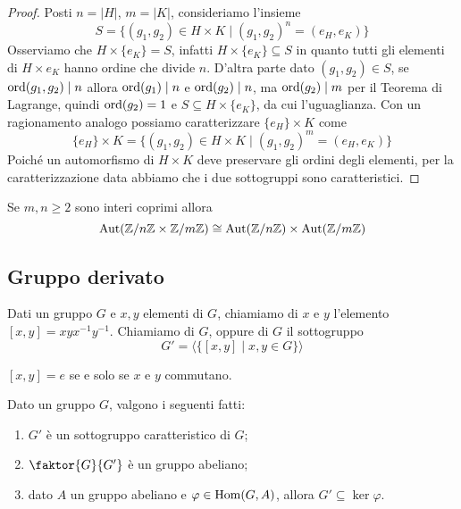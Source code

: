 \documentclass[11pt]{scrartcl}
\begin{document}
\begin{proof}
    Posti $n = |H|$, $m = |K|$, consideriamo l'insieme
    \[
        S = \{(g_1, g_2) \in H\times K\mid (g_1, g_2)^n = (e_H, e_K)\}\]
    Osserviamo che $H\times \{e_K\} = S$, infatti 
    $H\times \{e_K\} \subseteq S$ in quanto tutti gli elementi di $H\times{e_K}$
    hanno ordine che divide $n$. D'altra parte dato $(g_1, g_2) \in S$, se
    $\operatorname{ord}(g_1, g_2) \mid n$ allora $\operatorname{ord}(g_1)\mid n$ e $\operatorname{ord}(g_2)\mid n$, ma 
    $\operatorname{ord}(g_2) \mid m$ per il Teorema di Lagrange, quindi $\operatorname{ord}(g_2) = 1$ e
    $S \subseteq H\times\{e_K\}$, da cui l'uguaglianza. Con un ragionamento
    analogo possiamo caratterizzare $\{e_H\} \times K$ come 
    \[
        \{e_H\} \times K = \{(g_1, g_2) \in H\times K\mid (g_1, g_2)^m = (e_H, e_K)\}
    \] Poiché un automorfismo di $H\times K$ deve preservare gli ordini degli
    elementi, per la caratterizzazione data abbiamo che i due sottogruppi sono
    caratteristici.
\end{proof}

\begin{corollary}
    Se $m, n \geqslant 2$ sono interi coprimi allora
    \[
        \operatorname{Aut}({\mathbb Z}/n{\mathbb Z}\times{\mathbb Z}/m{\mathbb Z}) \cong \operatorname{Aut}({\mathbb Z}/n{\mathbb Z})\times \operatorname{Aut}({\mathbb Z}/m{\mathbb Z})
    \]
\end{corollary}

\newpage

\subsection{Gruppo derivato}

\begin{definition}
    Dati un gruppo $G$ e $x, y$ elementi di $G$, chiamiamo 
    di $x$ e $y$ l'elemento $[x, y] = xyx^{-1}y^{-1}$. Chiamiamo  di $G$, oppure  di $G$
     il sottogruppo 
    \[
        G' = \langle\{[x, y]\mid x, y \in G\}\rangle
    \]
\end{definition}

\begin{remark}
    $[x, y] = e$ se e solo se $x$ e $y$ commutano.
\end{remark}

\begin{proposition}
    Dato un gruppo $G$, valgono i seguenti fatti:
    \begin{enumerate}[(1)]
        \item $G'$ è un sottogruppo caratteristico di $G$;
        \item $\faktor{G}{G'}$ è un gruppo abeliano;
        \item dato $A$ un gruppo abeliano e $\varphi \in \operatorname{Hom}(G, A)$,
        allora $G' \subseteq \ker\varphi$.
    \end{enumerate}
\end{proposition}
\end{document}
